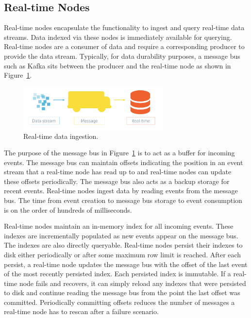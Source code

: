\documentclass{vldb}
\begin{document}
\subsection{Real-time Nodes}
\label{sec:realtime}
Real-time nodes encapsulate the functionality to ingest and query
real-time data streams. Data indexed via these nodes is immediately
available for querying. Real-time nodes are a consumer of data and
require a corresponding producer to provide the data
stream. Typically, for data durability purposes, a message bus such as
Kafka \cite{kreps2011kafka} sits between the producer and the real-time node as shown
in Figure~\ref{fig:data-ingestion}.

\begin{figure}
\centering
\includegraphics[width = 3in]{druid_message_bus}
\caption{Real-time data ingestion.}
\label{fig:data-ingestion}
\end{figure}

The purpose of the message bus in Figure~\ref{fig:data-ingestion} is to act as a buffer for
incoming events. The message bus can maintain offsets indicating the
position in an event stream that a real-time node has read up to and
real-time nodes can update these offsets periodically. The message bus also acts as a backup storage for recent events.
Real-time nodes ingest data by reading events from the message bus. The time from event creation to message bus storage to
event consumption is on the order of hundreds of milliseconds.

Real-time nodes maintain an in-memory index for all incoming
events. These indexes are incrementally populated as new events appear on the message bus. The indexes are also directly queryable.
Real-time nodes persist their indexes to disk either periodically or after some maximum row limit is
reached. After each persist, a real-time node updates the message bus
with the offset of the last event of the most recently persisted
index. Each persisted index is immutable. If a real-time node fails and recovers, it can simply reload
any indexes that were persisted to disk and continue reading the
message bus from the point the last offset was committed. Periodically committing offsets reduces the number of messages a real-time
node has to rescan after a failure scenario.
\end{document}
